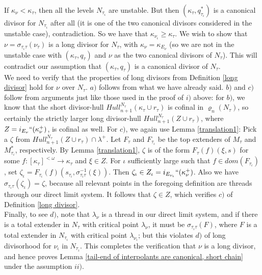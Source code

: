 \documentclass[12pt]{article}
\begin{document}
If $\kappa_\nu < \kappa_\tau$, then all the levels $N_{\tau_\iota}$ are unstable.  But then $( \kappa_\tau , q_{\tau_\iota}^*)$ is a canonical divisor for $N_{\tau_\iota}$ after all (it is one of the two canonical divisors considered in the unstable case), contradiction.  So we have that $\kappa_{\nu_\iota} \geq \kappa_\tau$.  We wish to show that $\nu = \sigma_{\tau_\iota \tau } ( \nu_\tau )$ is a long divisor for $N_\tau$, with $\kappa_\nu = \kappa_{E_\nu}$ (so we are not in the unstable case with $(\kappa_\tau , q_\tau)$ and $\nu$ as the two canonical divisors of $N_\tau$).  This will contradict our assumption that $(\kappa_\tau , q_\tau)$ is a canonical divisor of $N_\tau$.\\

We need to verify that the properties of long divisors from Definition \ref{long divisor} hold for $\nu$ over $N_\tau$.  $a)$ follows from what we have already said.  $b)$ and $c)$ follow from arguments just like those used in the proof of $i)$ above: for $b)$, we know that the short divisor-hull $Hull_{n+1}^{N_\tau} ( \kappa_\tau \cup r_\tau )$ is cofinal in $\varrho_n (N_\tau)$, so certainly the strictly larger long divisor-hull $Hull_{n+1}^{N_\tau} ( Z \cup r_\tau )$, where $Z = i_{E_\nu}`` (\kappa_\nu^+)$, is cofinal as well.  For $c)$, we again use Lemma \ref{translation1}: Pick a $\zeta$ from $Hull_{n+1}^{N_\tau} ( Z \cup r_\tau ) \cap \lambda^+$.  Let $F_\tau$ and $F_{\tau_\iota}$ be the top extenders of $M_\tau$ and $M_{\tau_\iota}^*$, respectively.  By Lemma \ref{translation1}, $\zeta$ is of the form $F_\tau (f) ( \xi , s )$ for some $f : [\kappa_\tau]^{< \omega} \longrightarrow \kappa_\tau$ and $\xi \in Z$.  For $\iota$ sufficiently large such that $f \in dom ( F_{\tau_\iota})$, set $\zeta_\iota = F_{\tau_\iota} (f) (s_{\tau_\iota} , \sigma_{\tau_\iota \tau}^{-1} (\xi) )$.  Then $\zeta_\iota \in Z_\iota = i_{E_{\nu_\iota}}`` (\kappa_\nu^+)$.  Also we have $\sigma_{\tau_\iota \tau } ( \zeta_\iota ) = \zeta$, because all relevant points in the foregoing definition are threads through our direct limit system.  It follows that $\zeta \in Z$, which verifies $c)$ of Definition \ref{long divisor}.\\



Finally, to see $d)$, note that $\lambda_\nu$ is a thread in our direct limit system, and if there is a total extender in $N_\tau$ with critical point $\lambda_\nu$, it must be $\sigma_{\tau_\iota \tau} (F)$, where $F$ is a total extender in $N_{\tau_\iota}$ with critical point $\lambda_{\nu_\iota}$; but this violates $d)$ of long divisorhood for $\nu_\iota$ in $N_{\tau_\iota}$.  This completes the verification that $\nu$ is a long divisor, and hence proves Lemma \ref{tail-end of interpolants are canonical, short chain} under the assumption $ii)$.\\
\end{document}
